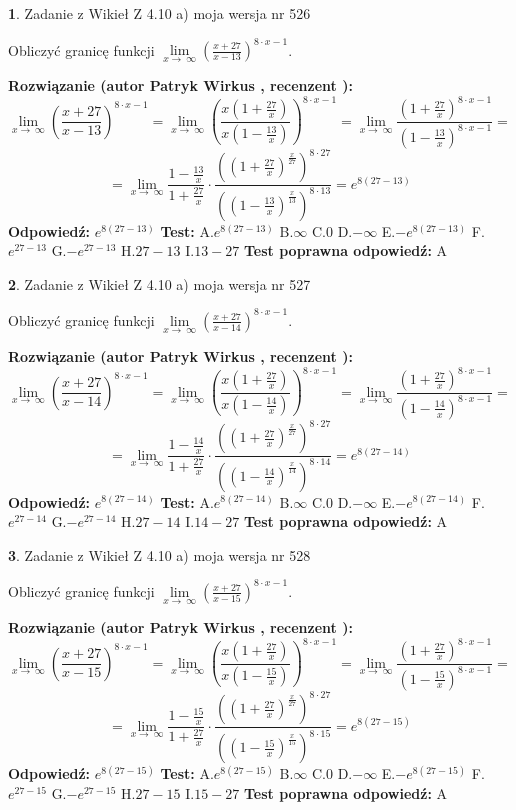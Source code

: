 \documentclass[12pt, a4paper]{article}
\theoremstyle{definition} %
\newtheorem{zad}{}
\newcommand{\zadStart}[1]{\begin{zad}#1\newline}
\newcommand{\zadStop}{\end{zad}}
\newcommand{\rozwStart}[2]{\noindent \textbf{Rozwiązanie (autor #1 , recenzent #2): }\newline}
\newcommand{\rozwStop}{\newline}
\newcommand{\odpStart}{\noindent \textbf{Odpowiedź:}\newline}
\newcommand{\odpStop}{\newline}
\newcommand{\testStart}{\noindent \textbf{Test:}\newline}
\newcommand{\testStop}{\newline}
\newcommand{\kluczStart}{\noindent \textbf{Test poprawna odpowiedź:}\newline}
\newcommand{\kluczStop}{\newline}
\begin{document}
\zadStart{Zadanie z Wikieł Z 4.10 a) moja wersja nr 526}


Obliczyć granicę funkcji  $\lim\limits_{x\to\ \infty}(\frac{x+27}{x-13})^{8\cdot x-1}$.
\zadStop
\rozwStart{Patryk Wirkus}{}
$$\lim\limits_{x\to\ \infty}(\frac{x+27}{x-13})^{8\cdot x-1} = \lim\limits_{x\to\ \infty}(\frac{x(1+\frac{27}{x})}{x(1-\frac{13}{x})})^{8\cdot x-1}=\lim\limits_{x\to\ \infty}\frac{(1+\frac{27}{x})^{8\cdot x-1}}{(1-\frac{13}{x})^{8\cdot x-1}}=$$
$$=\lim\limits_{x\to\ \infty}\frac{1-\frac{13}{x}}{1+\frac{27}{x}}\cdot\frac{((1+\frac{27}{x})^{\frac{x}{27}})^{8\cdot27}}{((1-\frac{13}{x})^{\frac{x}{13}})^{8\cdot13}}=e^{8(27-13)}$$
\rozwStop
\odpStart
$e^{8(27-13)}$
\odpStop
\testStart
A.$e^{8(27-13)}$ B.$\infty$ C.$0$ D.$-\infty$ E.$-e^{8(27-13)}$
F.$e^{27-13}$ G.$-e^{27-13}$
H.$27-13$
I.$13-27$
\testStop
\kluczStart
A
\kluczStop



\zadStart{Zadanie z Wikieł Z 4.10 a) moja wersja nr 527}


Obliczyć granicę funkcji  $\lim\limits_{x\to\ \infty}(\frac{x+27}{x-14})^{8\cdot x-1}$.
\zadStop
\rozwStart{Patryk Wirkus}{}
$$\lim\limits_{x\to\ \infty}(\frac{x+27}{x-14})^{8\cdot x-1} = \lim\limits_{x\to\ \infty}(\frac{x(1+\frac{27}{x})}{x(1-\frac{14}{x})})^{8\cdot x-1}=\lim\limits_{x\to\ \infty}\frac{(1+\frac{27}{x})^{8\cdot x-1}}{(1-\frac{14}{x})^{8\cdot x-1}}=$$
$$=\lim\limits_{x\to\ \infty}\frac{1-\frac{14}{x}}{1+\frac{27}{x}}\cdot\frac{((1+\frac{27}{x})^{\frac{x}{27}})^{8\cdot27}}{((1-\frac{14}{x})^{\frac{x}{14}})^{8\cdot14}}=e^{8(27-14)}$$
\rozwStop
\odpStart
$e^{8(27-14)}$
\odpStop
\testStart
A.$e^{8(27-14)}$ B.$\infty$ C.$0$ D.$-\infty$ E.$-e^{8(27-14)}$
F.$e^{27-14}$ G.$-e^{27-14}$
H.$27-14$
I.$14-27$
\testStop
\kluczStart
A
\kluczStop



\zadStart{Zadanie z Wikieł Z 4.10 a) moja wersja nr 528}


Obliczyć granicę funkcji  $\lim\limits_{x\to\ \infty}(\frac{x+27}{x-15})^{8\cdot x-1}$.
\zadStop
\rozwStart{Patryk Wirkus}{}
$$\lim\limits_{x\to\ \infty}(\frac{x+27}{x-15})^{8\cdot x-1} = \lim\limits_{x\to\ \infty}(\frac{x(1+\frac{27}{x})}{x(1-\frac{15}{x})})^{8\cdot x-1}=\lim\limits_{x\to\ \infty}\frac{(1+\frac{27}{x})^{8\cdot x-1}}{(1-\frac{15}{x})^{8\cdot x-1}}=$$
$$=\lim\limits_{x\to\ \infty}\frac{1-\frac{15}{x}}{1+\frac{27}{x}}\cdot\frac{((1+\frac{27}{x})^{\frac{x}{27}})^{8\cdot27}}{((1-\frac{15}{x})^{\frac{x}{15}})^{8\cdot15}}=e^{8(27-15)}$$
\rozwStop
\odpStart
$e^{8(27-15)}$
\odpStop
\testStart
A.$e^{8(27-15)}$ B.$\infty$ C.$0$ D.$-\infty$ E.$-e^{8(27-15)}$
F.$e^{27-15}$ G.$-e^{27-15}$
H.$27-15$
I.$15-27$
\testStop
\kluczStart
A
\kluczStop
\end{document}

